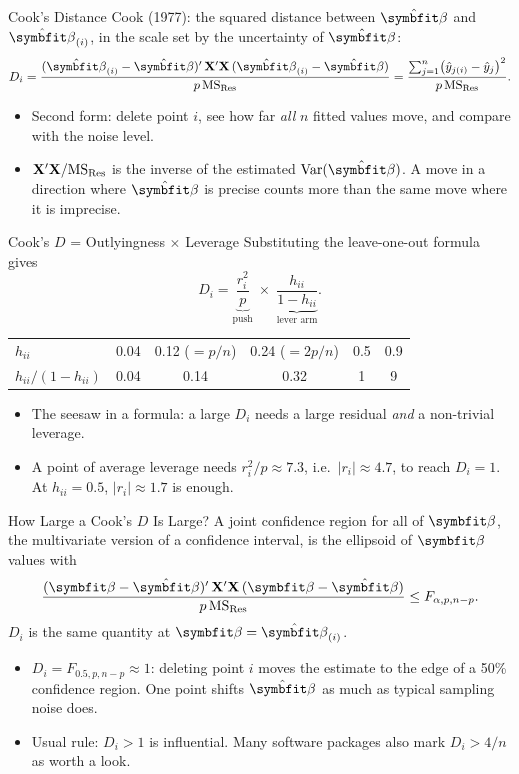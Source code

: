 \begin{frame}{Cook's Distance}
    Cook (1977): the squared distance between $\hat{\bbeta}$ and $\hat{\bbeta}_{(i)}$, in the scale set by the uncertainty of $\hat{\bbeta}$:
    \[
    D_i=\frac{(\hat{\bbeta}_{(i)}-\hat{\bbeta})'\,\bX'\bX\,(\hat{\bbeta}_{(i)}-\hat{\bbeta})}{p\,\MSRes}
    =\frac{\sum_{j=1}^n\bigl(\hat y_{j(i)}-\hat y_j\bigr)^2}{p\,\MSRes}.
    \]
    \begin{itemize}
        \item Second form: delete point $i$, see how far \emph{all} $n$ fitted values move, and compare with the noise level.
        \item $\mathbf{X}'\mathbf{X}/\mathrm{MS}_{\mathrm{Res}}$ is the inverse of the estimated $\Var(\hat{\bbeta})$. A move in a direction where $\hat{\bbeta}$ is precise counts more than the same move where it is imprecise.
    \end{itemize}
\end{frame}


\begin{frame}{Cook's $D$ = Outlyingness $\times$ Leverage}
    Substituting the leave-one-out formula gives
    \[
    D_i=\underbrace{\frac{r_i^2}{p}}_{\text{push}}\;\times\;\underbrace{\frac{h_{ii}}{1-h_{ii}}}_{\text{lever arm}} .
    \]
    \begin{center}
        \footnotesize
        \begin{tabular}{lccccc}
            \toprule
            $h_{ii}$ & 0.04 & 0.12 ($=p/n$) & 0.24 ($=2p/n$) & 0.5 & 0.9 \\
            $h_{ii}/(1-h_{ii})$ & 0.04 & 0.14 & 0.32 & 1 & 9 \\
            \bottomrule
        \end{tabular}
    \end{center}
    \begin{itemize}
        \item The seesaw in a formula: a large $D_i$ needs a large residual \emph{and} a non-trivial leverage.
        \item A point of average leverage needs $r_i^2/p\approx7.3$, i.e.\ $|r_i|\approx4.7$, to reach $D_i=1$. At $h_{ii}=0.5$, $|r_i|\approx1.7$ is enough.
    \end{itemize}
\end{frame}


\begin{frame}{How Large a Cook's $D$ Is Large?}
    A joint confidence region for all of $\bbeta$, the multivariate version of a confidence interval, is the ellipsoid of $\bbeta$ values with
    \[
    \frac{(\bbeta-\hat{\bbeta})'\,\bX'\bX\,(\bbeta-\hat{\bbeta})}{p\,\MSRes}\le F_{\alpha,p,n-p}.
    \]
    $D_i$ is the same quantity at $\bbeta=\hat{\bbeta}_{(i)}$.
    \begin{itemize}
        \item $D_i=F_{0.5,p,n-p}\approx1$: deleting point $i$ moves the estimate to the edge of a 50\% confidence region. One point shifts $\hat{\bbeta}$ as much as typical sampling noise does.
        \item Usual rule: $D_i>1$ is influential. Many software packages also mark $D_i>4/n$ as worth a look.
    \end{itemize}
\end{frame}


